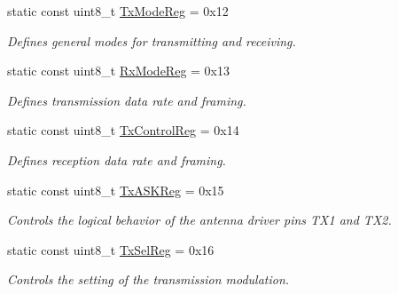 \begin{DoxyCompactItemize}
\mbox{\label{classMFRC522_a5f1ad3684cab8e35cb55c0ee88b1169e}} 
static const uint8\+\_\+t \hyperlink{classMFRC522_a5f1ad3684cab8e35cb55c0ee88b1169e}{Tx\+Mode\+Reg} = 0x12
\begin{DoxyCompactList}\small\item\em Defines general modes for transmitting and receiving. \end{DoxyCompactList}\item 
\mbox{\label{classMFRC522_afa09626edf95b29b5a0a2704163856c4}} 
static const uint8\+\_\+t \hyperlink{classMFRC522_afa09626edf95b29b5a0a2704163856c4}{Rx\+Mode\+Reg} = 0x13
\begin{DoxyCompactList}\small\item\em Defines transmission data rate and framing. \end{DoxyCompactList}\item 
\mbox{\label{classMFRC522_a31362c1d22f22ba49b0154cd91d9a1f8}} 
static const uint8\+\_\+t \hyperlink{classMFRC522_a31362c1d22f22ba49b0154cd91d9a1f8}{Tx\+Control\+Reg} = 0x14
\begin{DoxyCompactList}\small\item\em Defines reception data rate and framing. \end{DoxyCompactList}\item 
\mbox{\label{classMFRC522_a6be33368376daa7fca206ef5847eae70}} 
static const uint8\+\_\+t \hyperlink{classMFRC522_a6be33368376daa7fca206ef5847eae70}{Tx\+A\+S\+K\+Reg} = 0x15
\begin{DoxyCompactList}\small\item\em Controls the logical behavior of the antenna driver pins T\+X1 and T\+X2. \end{DoxyCompactList}\item 
\mbox{\label{classMFRC522_aed95c578c94a3aebe377736621b80bda}} 
static const uint8\+\_\+t \hyperlink{classMFRC522_aed95c578c94a3aebe377736621b80bda}{Tx\+Sel\+Reg} = 0x16
\begin{DoxyCompactList}\small\item\em Controls the setting of the transmission modulation. \end{DoxyCompactList}\item 
\mbox{\label{classMFRC522_ac2c0cc7b2d5068c85074acc23a648304}} 

\end{DoxyCompactItemize}
